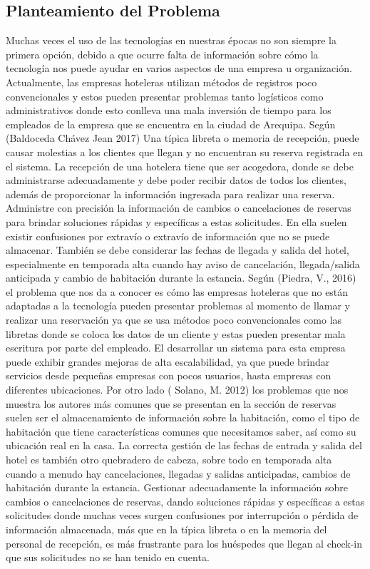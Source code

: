 \documentclass[12pt,a4paper,oneside]{article}
\begin{document}
\subsection{Planteamiento del Problema}
Muchas veces el uso de las tecnologías en nuestras épocas no son siempre la primera opción, debido a que ocurre falta de información sobre cómo la tecnología nos puede ayudar en varios aspectos de una empresa u organización. Actualmente, las empresas hoteleras utilizan métodos de registros poco convencionales y estos pueden presentar problemas tanto logísticos como administrativos donde esto conlleva una mala inversión de tiempo para los empleados de la empresa que se encuentra en la ciudad de Arequipa.   
Según (Baldoceda Chávez Jean 2017) Una típica libreta o memoria de recepción, puede causar molestias a los clientes que llegan y no encuentran su reserva registrada en el sistema. La recepción de una hotelera tiene que ser acogedora, donde se debe administrarse adecuadamente y debe poder recibir datos de todos los clientes, además de proporcionar la información ingresada para realizar una reserva. Administre con precisión la información de cambios o cancelaciones de reservas para brindar soluciones rápidas y específicas a estas solicitudes. En ella suelen existir confusiones por extravío o extravío de información que no se puede almacenar. También se debe considerar las fechas de llegada y salida del hotel, especialmente en temporada alta cuando hay aviso de cancelación, llegada/salida anticipada y cambio de habitación durante la estancia. Según (Piedra, V., 2016) el problema que nos da a conocer es cómo las empresas hoteleras que no están adaptadas a la tecnología pueden presentar problemas al momento de llamar y realizar una reservación ya que se usa métodos poco convencionales como las libretas donde se coloca los datos de un cliente y estas pueden presentar mala escritura por parte del empleado. El desarrollar un sistema para esta empresa puede exhibir grandes mejoras de alta escalabilidad, ya que puede brindar servicios desde pequeñas empresas con pocos usuarios, hasta empresas con diferentes ubicaciones.  
Por otro lado (	Solano, M. 2012) los problemas que nos muestra los autores más comunes que se presentan en la sección de reservas suelen ser el almacenamiento de información sobre la habitación, como el tipo de habitación que tiene características comunes que necesitamos saber, así como su ubicación real en la casa. La correcta gestión de las fechas de entrada y salida del hotel es también otro quebradero de cabeza, sobre todo en temporada alta cuando a menudo hay cancelaciones, llegadas y salidas anticipadas, cambios de habitación durante la estancia. Gestionar adecuadamente la información sobre cambios o cancelaciones de reservas, dando soluciones rápidas y específicas a estas solicitudes donde muchas veces surgen confusiones por interrupción o pérdida de información almacenada, más que en la típica libreta o en la memoria del personal de recepción, es más frustrante para los huéspedes que llegan al check-in que sus solicitudes no se han tenido en cuenta.
\end{document}
